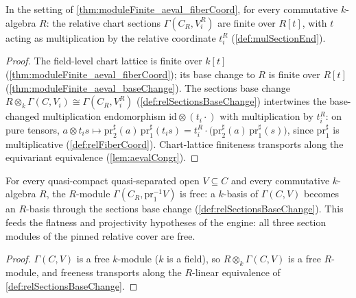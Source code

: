 \begin{theorem}
  \label{thm:moduleFinite_aeval_relFiberCoord}
  \leanok
  In the setting of \ref{thm:moduleFinite_aeval_fiberCoord}, for every commutative
  \(k\)-algebra \(R\): the relative chart sections \(\Gamma(C_R, V_i^R)\) are finite
  over \(R[t]\), with \(t\) acting as multiplication by the relative coordinate
  \(t_i^R\) (\ref{def:mulSectionEnd}).
\end{theorem}
\begin{proof}
  \leanok
  The field-level chart lattice is finite over \(k[t]\)
  (\ref{thm:moduleFinite_aeval_fiberCoord}); its base change to \(R\) is finite over
  \(R[t]\) (\ref{thm:moduleFinite_aeval_baseChange}). The sections base change
  \(R \otimes_k \Gamma(C, V_i) \cong \Gamma(C_R, V_i^R)\)
  (\ref{def:relSectionsBaseChange}) intertwines the base-changed multiplication
  endomorphism \(\mathrm{id} \otimes (t_i \cdot)\) with multiplication by \(t_i^R\):
  on pure tensors, \(a \otimes t_i s \mapsto \mathrm{pr}_2^{\sharp}(a)\,
  \mathrm{pr}_1^{\sharp}(t_i s) = t_i^R \cdot \bigl(\mathrm{pr}_2^{\sharp}(a)\,
  \mathrm{pr}_1^{\sharp}(s)\bigr)\), since \(\mathrm{pr}_1^{\sharp}\) is multiplicative
  (\ref{def:relFiberCoord}). Chart-lattice finiteness transports along the equivariant
  equivalence (\ref{lem:aevalCongr}).
\end{proof}

\begin{theorem}
  \label{thm:free_relSections}
  \leanok
  For every quasi-compact quasi-separated open \(V \subseteq C\) and every commutative
  \(k\)-algebra \(R\), the \(R\)-module \(\Gamma(C_R, \mathrm{pr}_1^{-1}V)\) is free:
  a \(k\)-basis of \(\Gamma(C, V)\) becomes an \(R\)-basis through the sections base
  change (\ref{def:relSectionsBaseChange}). This feeds the flatness and projectivity
  hypotheses of the engine: all three section modules of the pinned relative cover are
  free.
\end{theorem}
\begin{proof}
  \leanok
  \(\Gamma(C, V)\) is a free \(k\)-module (\(k\) is a field), so
  \(R \otimes_k \Gamma(C, V)\) is a free \(R\)-module, and freeness transports along
  the \(R\)-linear equivalence of \ref{def:relSectionsBaseChange}.
\end{proof}

